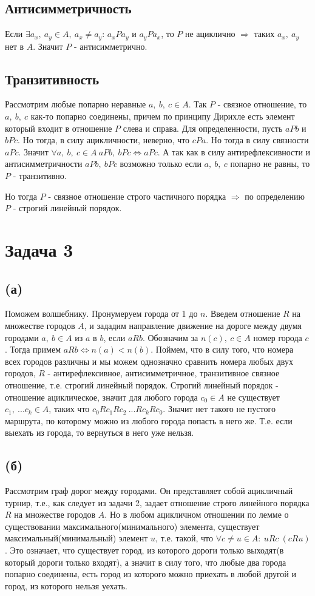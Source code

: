 \documentclass{article}
\begin{document}
	\subsection{Антисимметричность}
	Если $\exists a_x, \ a_y \in A, \ a_x \ne a_y$: $a_xPa_y$ и $a_yPa_x$, то $P$ не ациклично $\Rightarrow$ таких $a_x, \ a_y$ нет в $A$. Значит $P$ - антисимметрично.
	
	\subsection{Транзитивность}
	Рассмотрим любые попарно неравные $a,\ b,\ c \in A$. Так $P$ - связное отношение, то  $a,\ b,\ c$ как-то попарно соединены, причем по принципу Дирихле есть элемент который входит в отношение $P$ слева и справа. Для определенности, пусть $aPb$ и $bPc$. Но тогда, в силу ацикличности, неверно, что $c P a$. Но тогда в силу связности $a P c$. Значит $\forall a,\ b,\ c \in A\ aPb,\ bPc \Leftrightarrow aPc$. А так как в силу антирефлексивности и антисимметричности $aPb,\ bPc$ возможно только если $a,\ b,\ c$ попарно не равны, то $P$ - транзитивно.
	
	Но тогда $P$ - связное отношение строго частичного порядка $\Rightarrow$ по определению $P$ - строгий линейный порядок.
	
	\section {Задача 3}
	\subsection {(а)} Поможем волшебнику. Пронумеруем города от 1 до $n$. Введем отношение $R$ на множестве городов $A$, и зададим направление движение на дороге между двумя городами $a,\ b \in A$ из $a$ в $b$, если $aRb$. Обозначим за $n(c),\ c \in A$ номер города $c$. Тогда примем $aRb \Leftrightarrow n(a) < n(b)$. Поймем, что в силу того, что номера всех городов различны и мы можем однозначно сравнить номера любых двух городов, $R$ - антирефлексивное, антисимметричное, транзитивное связное отношение, т.е. строгий линейный порядок. Строгий линейный порядок - отношение ациклическое, значит для любого города $c_0 \in A$ не существует $c_1,\ ...c_k \in A$, таких что $c_0Rc_1Rc_2\ ... Rc_kRc_0$. Значит нет такого не пустого маршрута, по которому можно из любого города попасть в него же. Т.е. если выехать из города, то вернуться в него уже нельзя.
	\subsection {(б)}
	Рассмотрим граф дорог между городами. Он представляет собой ацикличный турнир, т.е., как следует из задачи 2, задает отношение строго линейного порядка $R$ на множестве городов $A$.
	Но в любом ацикличном отношении по лемме о существовании максимального(минимального) элемента, существует максимальный(минимальный) элемент $u$, т.е. такой, что $\forall c \ne u \in A:\ uRc\ (cRu) $. Это означает, что существует город, из которого дороги только выходят(в который дороги только входят), а значит в силу того, что любые два города попарно соединены, есть город из которого можно приехать в любой другой и город, из которого нельзя уехать. 
\end{document}
